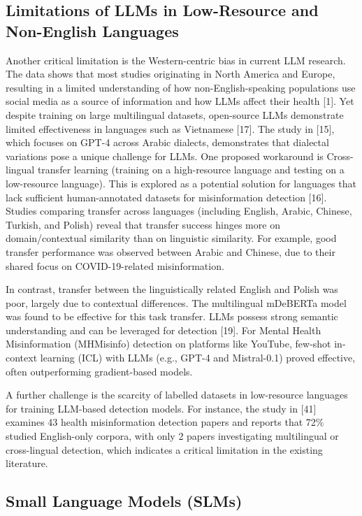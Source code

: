 \documentclass[]{article}
\begin{document}
\subsection{Limitations of LLMs in Low-Resource and Non-English Languages}

Another critical limitation is the Western-centric bias in current LLM
research. The data shows that most studies originating in North America and Europe,
resulting in a limited understanding of how non-English-speaking
populations use social media as a source of information and how LLMs affect their health {[}1{]}.
Yet despite training on large multilingual datasets, open-source LLMs
demonstrate limited effectiveness in languages such as Vietnamese
{[}17{]}. The study in {[}15{]}, which focuses on GPT-4 across Arabic
dialects, demonstrates that dialectal variations pose a unique challenge
for LLMs. One proposed workaround is Cross-lingual transfer learning (training on a high-resource
language and testing on a low-resource language). This is explored as a
potential solution for languages that lack sufficient human-annotated
datasets for misinformation detection {[}16{]}. Studies comparing
transfer across languages (including English, Arabic, Chinese, Turkish,
and Polish) reveal that transfer success hinges more on
domain/contextual similarity than on linguistic similarity. For example,
good transfer performance was observed between Arabic and Chinese, due
to their shared focus on COVID-19-related misinformation.

In contrast, transfer between the linguistically related English and
Polish was poor, largely due to contextual differences. The multilingual
mDeBERTa model was found to be effective for this task transfer. LLMs
possess strong semantic understanding and can be leveraged for detection
{[}19{]}. For Mental Health Misinformation (MHMisinfo) detection on
platforms like YouTube, few-shot in-context learning (ICL) with LLMs
(e.g., GPT-4 and Mistral-0.1) proved effective, often outperforming
gradient-based models.

A further challenge is the scarcity of labelled datasets in
low-resource languages for training LLM-based detection models.
For instance, the study in {[}41{]}
examines 43 health misinformation detection papers and reports that 72\%
studied English-only corpora, with only 2 papers investigating
multilingual or cross-lingual detection, which indicates a critical limitation in the existing literature.
\subsection{Small Language Models (SLMs)}
\end{document}
